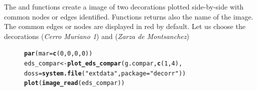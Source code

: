 \documentclass[article]{jss}\usepackage[]{graphicx}\usepackage[]{color}
\makeatletter
\newcommand{\hlnum}[1]{\textcolor[rgb]{0.686,0.059,0.569}{#1}}%
\newcommand{\hlstr}[1]{\textcolor[rgb]{0.192,0.494,0.8}{#1}}%
\newcommand{\hlstd}[1]{\textcolor[rgb]{0.345,0.345,0.345}{#1}}%
\newcommand{\hlkwb}[1]{\textcolor[rgb]{0.69,0.353,0.396}{#1}}%
\newcommand{\hlkwc}[1]{\textcolor[rgb]{0.333,0.667,0.333}{#1}}%
\newcommand{\hlkwd}[1]{\textcolor[rgb]{0.737,0.353,0.396}{\textbf{#1}}}%
\newenvironment{kframe}{%
 \def\at@end@of@kframe{}%
 \ifinner\ifhmode%
  \def\at@end@of@kframe{\end{minipage}}%
  \begin{minipage}{\columnwidth}%
 \fi\fi%
 \def\FrameCommand##1{\hskip\@totalleftmargin \hskip-\fboxsep
 \colorbox{shadecolor}{##1}\hskip-\fboxsep
     \hskip-\linewidth \hskip-\@totalleftmargin \hskip\columnwidth}%
 \MakeFramed {\advance\hsize-\width
   \@totalleftmargin\z@ \linewidth\hsize
   \@setminipage}}%
 {\par\unskip\endMakeFramed%
 \at@end@of@kframe}
\newenvironment{knitrout}{}{} %
\makeatother
\begin{document}
The and  functions create a  image of two decorations plotted side-by-side with common nodes or edges identified. Functions returns also the name of the image. The common edges or nodes are displayed in red by default. Let us choose the decorations  (\emph{Cerro Muriano 1}) and  (\emph{Zarza de Montsanchez})

\begin{figure}[H]
\begin{knitrout}
\color{fgcolor}\begin{kframe}
\begin{alltt}
\hlkwd{par}\hlstd{(}\hlkwc{mar}\hlstd{=}\hlkwd{c}\hlstd{(}\hlnum{0}\hlstd{,}\hlnum{0}\hlstd{,}\hlnum{0}\hlstd{,}\hlnum{0}\hlstd{))}
\hlstd{eds_compar} \hlkwb{<-} \hlkwd{plot_eds_compar}\hlstd{(g.compar,} \hlkwd{c}\hlstd{(}\hlnum{1}\hlstd{,}\hlnum{4}\hlstd{),}
                              \hlkwc{doss} \hlstd{=} \hlkwd{system.file}\hlstd{(}\hlstr{"extdata"}\hlstd{,} \hlkwc{package} \hlstd{=} \hlstr{"decorr"}\hlstd{))}
\hlkwd{plot}\hlstd{(}\hlkwd{image_read}\hlstd{(eds_compar))}
\end{alltt}
\end{kframe}

\end{knitrout}
\end{figure}
\end{document}
